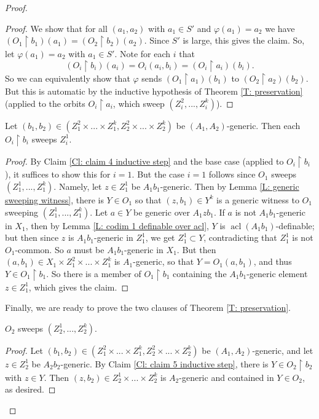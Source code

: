\documentclass[10pt,a4paper]{amsart}
\newcommand{\acl}{\operatorname{acl}}
\begin{document}
\begin{proof}
\begin{proof}
        We show that for all $(a_1,a_2)$ with $a_1\in S'$ and $\varphi(a_1)=a_2$ we have $(O_1\restriction b_1)(a_1)=(O_2\restriction b_2)(a_2)$. Since $S'$ is large, this gives the claim. So, let $\varphi(a_1)=a_2$ with $a_1\in S'$. Note for each $i$ that $$(O_i\restriction b_i)(a_i)=O_i(a_i,b_i)=(O_i\restriction a_i)(b_i).$$ So we can equivalently show that $\varphi$ sends $(O_1\restriction a_1)(b_1)$ to $(O_2\restriction a_2)(b_2)$. But this is automatic by the inductive hypothesis of Theorem \ref{T: preservation} (applied to the orbits $O_i\restriction a_i$, which sweep $(Z_i^2,...,Z_i^k)$).
    \end{proof}

    \begin{claim}\label{Cl: claim 5 inductive step}
    Let $(b_1,b_2)\in(Z_1^2\times...\times Z_1^k,Z_2^2\times...\times Z_2^k)$ be $(A_1,A_2)$-generic. Then each $O_i\restriction b_i$ sweeps $Z_i^1$.
    \end{claim}
    \begin{proof}
        By Claim \ref{Cl: claim 4 inductive step} and the base case (applied to $O_i\restriction b_i$), it suffices to show this for $i=1$. But the case $i=1$ follows since $O_1$ sweeps $(Z_1^1,...,Z_1^k)$. Namely, let $z\in Z_1^1$ be $A_1b_1$-generic. Then by Lemma \ref{L: generic sweeping witness}, there is $Y\in O_1$ so that $(z,b_1)\in Y^k$ is a generic witness to $O_1$ sweeping $(Z_1^1,...,Z_1^k)$. Let $a\in Y$ be generic over $A_1zb_1$. If $a$ is not $A_1b_1$-generic in $X_1$, then by Lemma \ref{L: codim 1 definable over acl}, $Y$ is $\acl(A_1b_1)$-definable; but then since $z$ is $A_1b_1$-generic in $Z_1^1$, we get $Z_1^1\subset Y$, contradicting that $Z_1^1$ is not $O_1$-common. So $a$ must be $A_1b_1$-generic in $X_1$. But then $(a,b_1)\in X_1\times Z_1^2\times...\times Z_1^k$ is $A_1$-generic, so that $Y=O_1(a,b_1)$, and thus $Y\in O_1\restriction b_1$. So there is a member of $O_1\restriction b_1$ containing the $A_1b_1$-generic element $z\in Z_1^1$, which gives the claim. 
    \end{proof} 

    Finally, we are ready to prove the two clauses of Theorem \ref{T: preservation}.

    \begin{claim}
        $O_2$ sweeps $(Z_2^1,...,Z_2^k)$.
    \end{claim}
    \begin{proof}
       Let $(b_1,b_2)\in(Z_1^2\times...\times Z_1^k,Z_2^2\times...\times Z_2^k)$ be $(A_1,A_2)$-generic, and let $z\in Z_2^1$ be $A_2b_2$-generic. By Claim \ref{Cl: claim 5 inductive step}, there is $Y\in O_2\restriction b_2$ with $z\in Y$. Then $(z,b_2)\in Z_2^1\times...\times Z_2^k$ is $A_2$-generic and contained in $Y\in O_2$, as desired.
    \end{proof}


\end{proof}
\end{document}
